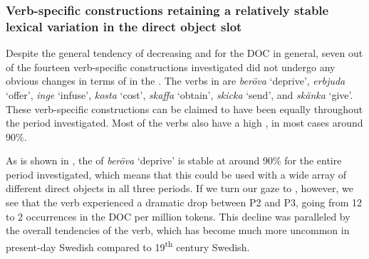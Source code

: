 \documentclass[output=paper]{langscibook}
\begin{document}
\subsubsection{Verb-specific constructions retaining a relatively stable lexical variation in the direct object slot}\label{sec:valdeson:5.3.3}


Despite the general tendency of decreasing  and  for the DOC in general, seven out of the fourteen verb-specific constructions investigated did not undergo any obvious changes in terms of  in the . The verbs in  are \textit{beröva} ‘deprive’, \textit{erbjuda} ‘offer’, \textit{inge} ‘infuse’, \textit{kosta} ‘cost’, \textit{skaffa} ‘obtain’, \textit{skicka} ‘send’, and \textit{skänka} ‘give’. These verb-specific constructions can be claimed to have been equally  throughout the period investigated. Most of the verbs also have a high , in most cases around 90\%.



\label{sec:valdeson:5.3.3.1}



As is shown in , the  of \textit{beröva} ‘deprive’ is stable at around 90\% for the entire period investigated, which means that this  could be used with a wide array of different direct objects in all three periods. If we turn our gaze to , however, we see that the verb experienced a dramatic drop between P2 and P3, going from 12 to 2 occurrences in the DOC per million tokens. This decline was paralleled by the overall tendencies of the verb, which has become much more uncommon in present-day Swedish compared to 19\textsuperscript{th} century Swedish.


\begin{table}
\caption{Frequency measures of the verb{}-specific DOC with \textit{beröva} ‘deprive’}
\label{tab:valdeson:14}
\end{table}
\end{document}
